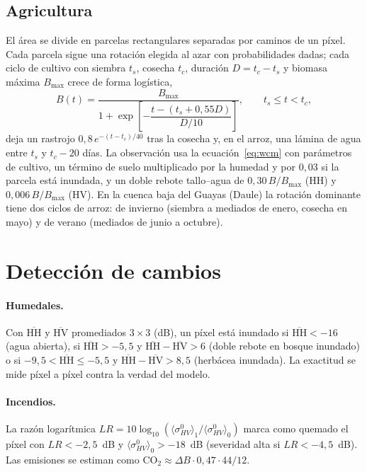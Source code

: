 \documentclass[11pt,a4paper]{article}
\begin{document}
\subsection{Agricultura}
El área se divide en parcelas rectangulares separadas por caminos de un píxel. Cada parcela sigue una
rotación elegida al azar con probabilidades dadas; cada ciclo de cultivo con siembra $t_s$, cosecha
$t_c$, duración $D = t_c - t_s$ y biomasa máxima $B_{\max}$ crece de forma logística,
\begin{equation}
  B(t) = \frac{B_{\max}}{1 + \exp\!\left[-\dfrac{t - (t_s + 0{,}55D)}{D/10}\right]},\qquad t_s\le t<t_c,
\end{equation}
deja un rastrojo $0{,}8\,e^{-(t-t_c)/40}$ tras la cosecha y, en el arroz, una lámina de agua entre $t_s$ y
$t_c - 20$ días. La observación usa la ecuación~\eqref{eq:wcm} con parámetros de cultivo, un término
de suelo multiplicado por la humedad y por $0{,}03$ si la parcela está inundada, y un doble rebote
tallo--agua de $0{,}30\,B/B_{\max}$ (HH) y $0{,}006\,B/B_{\max}$ (HV). En la cuenca baja del Guayas
(Daule) la rotación dominante tiene dos ciclos de arroz: de invierno (siembra a mediados de enero,
cosecha en mayo) y de verano (mediados de junio a octubre).

\section{Detección de cambios}

\paragraph{Humedales.} Con $\overline{\mathrm{HH}}$ y $\overline{\mathrm{HV}}$ promediados $3\times3$ (dB),
un píxel está inundado si $\overline{\mathrm{HH}}<-16$ (agua abierta), si $\overline{\mathrm{HH}}>-5{,}5$ y
$\overline{\mathrm{HH}}-\overline{\mathrm{HV}}>6$ (doble rebote en bosque inundado) o si
$-9{,}5<\overline{\mathrm{HH}}\le-5{,}5$ y $\overline{\mathrm{HH}}-\overline{\mathrm{HV}}>8{,}5$ (herbácea
inundada). La exactitud se mide píxel a píxel contra la verdad del modelo.

\paragraph{Incendios.} La razón logarítmica
$LR = 10\log_{10}\left(\langle\sigma^0_{HV}\rangle_{1}/\langle\sigma^0_{HV}\rangle_{0}\right)$ marca como
quemado el píxel con $LR<-2{,}5$~dB y $\langle\sigma^0_{HV}\rangle_0>-18$~dB (severidad alta si
$LR<-4{,}5$~dB). Las emisiones se estiman como $\mathrm{CO_2}\approx\Delta B\cdot 0{,}47\cdot 44/12$.
\end{document}
